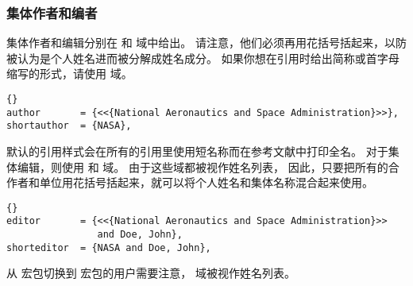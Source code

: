 \subsubsection{集体作者和编者}%
\label{bib:use:inc}


集体作者和编辑分别在  和  域中给出。
请注意，他们必须再用花括号括起来，以防被认为是个人姓名进而被分解成姓名成分。
如果你想在引用时给出简称或首字母缩写的形式，请使用  域。

\begin{lstlisting}[style=bibtex]{}
author       = {<<{National Aeronautics and Space Administration}>>},
shortauthor  = {NASA},
\end{lstlisting}
%
默认的引用样式会在所有的引用里使用短名称而在参考文献中打印全名。
对于集体编辑，则使用  和  域。
由于这些域都被视作姓名列表，
因此，只要把所有的合作者和单位用花括号括起来，就可以将个人姓名和集体名称混合起来使用。

\begin{lstlisting}[style=bibtex]{}
editor       = {<<{National Aeronautics and Space Administration}>>
                and Doe, John},
shorteditor  = {NASA and Doe, John},
\end{lstlisting}
%
从  宏包切换到 \biblatex 宏包的用户需要注意，
 域被视作姓名列表。

